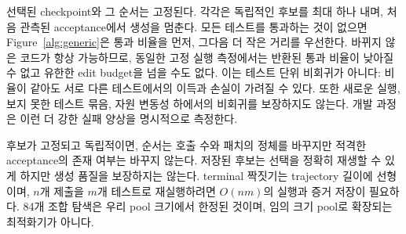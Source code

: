\documentclass[10pt,conference]{IEEEtran}
\begin{document}
선택된 checkpoint와 그 순서는 고정된다. 각각은 독립적인 후보를 최대 하나 내며, 처음 관측된 acceptance에서 생성을 멈춘다. 모든 테스트를 통과하는 것이 없으면 Figure~\ref{alg:generic}은 통과 비율을 먼저, 그다음 더 작은 거리를 우선한다. 바뀌지 않은 코드가 항상 가능하므로, 동일한 고정 실행 측정에서는 반환된 통과 비율이 낮아질 수 없고 유한한 edit budget을 넘을 수도 없다. 이는 테스트 단위 비회귀가 아니다: 비율이 같아도 서로 다른 테스트에서의 이득과 손실이 가려질 수 있다. 또한 새로운 실행, 보지 못한 테스트 묶음, 자원 변동성 하에서의 비회귀를 보장하지도 않는다. 개발 과정은 이런 더 강한 실패 양상을 명시적으로 측정한다.

후보가 고정되고 독립적이면, 순서는 호출 수와 패치의 정체를 바꾸지만 적격한 acceptance의 존재 여부는 바꾸지 않는다. 저장된 후보는 선택을 정확히 재생할 수 있게 하지만 생성 품질을 보장하지는 않는다. terminal 짝짓기는 trajectory 길이에 선형이며, \(n\)개 제출을 \(m\)개 테스트로 재실행하려면 \(O(nm)\)의 실행과 증거 저장이 필요하다. 84개 조합 탐색은 우리 pool 크기에서 한정된 것이며, 임의 크기 pool로 확장되는 최적화기가 아니다.
\end{document}
